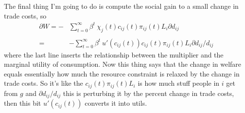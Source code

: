 \documentclass[12pt,pdftex]{article}
\begin{document}
\begin{onehalfspacing}
The final thing I'm going to do is compute the social gain to a small change in trade costs, so
\begin{align}
\partial W = - & \sum_{t=0}^{\infty} \beta^{t} \ \chi_{j}(t) c_{ij}(t) \pi_{ij}(t) L_{i} \partial d_{ij} \\
\nonumber \\
=& - \sum_{t=0}^{\infty} \beta^{t} \ u'(c_{ij}(t)) c_{ij}(t) \pi_{ij}(t) L_{i} \partial d_{ij} / d_{ij}
\end{align}
where the last line inserts the relationship between the multiplier and the marginal utility of consumption. Now this thing says that the change in welfare equals essentially how much the resource constraint is relaxed by the change in trade costs. So it's like the $c_{ij}(t) \pi_{ij}(t) L_{i}$ is how much stuff people in $i$ get from $g$ and $\partial d_{ij} / d_{ij}$ this is perturbing it by the percent change in trade costs, then this bit $u'(c_{ij}(t))$ converts it into utils.


\end{onehalfspacing}
\end{document}
